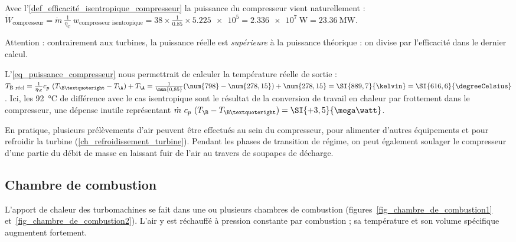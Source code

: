 \begin{anexample}
\begin{answer}
					 Avec l’\cref{def_efficacité_isentropique_compresseur} la puissance du compresseur vient naturellement : $\dot W_\text{compresseur} = \dot m \ \frac{1}{\eta_\text{C}} \ w_\text{compresseur isentropique} = \num{38} \times \frac{1}{\num{0,85}} \times \num{5,225e5} = \SI{2,336e7}{\watt} = \SI{23,36}{\mega\watt}$.
					 	\begin{remark}
					 		Attention : contrairement aux turbines, la puissance réelle est \emph{supérieure} à la puissance théorique : on divise par l’efficacité dans le dernier calcul.
					 	\end{remark}
					 	\begin{remark}
					 		L’\cref{eq_puissance_compresseur} nous permettrait de calculer la température réelle de sortie : $T_\text{B réel} = \frac{1}{\eta_\C} c_p \ (T_{\B’} - T_\A) + T_\A = \frac{1}{\num{0,85}} (\num{798} - \num{278,15}) + \num{278,15} = \SI{889,7}{\kelvin} = \SI{616,6}{\degreeCelsius}$. Ici, les \SI{92}{\degreeCelsius} de différence avec le cas isentropique sont le résultat de la conversion de travail en chaleur par frottement dans le compresseur, une dépense inutile représentant $\dot m \ c_p \ (T_\B - T_{\B’}) = \SI{+3,5}{\mega\watt}$.
					 	\end{remark}
				\end{answer}
		\end{anexample}

		En pratique, plusieurs prélèvements d’air peuvent être effectués au sein du compresseur, pour alimenter d’autres équipements et pour refroidir la turbine (\ref{ch_refroidissement_turbine}). Pendant les phases de transition de régime, on peut également soulager le compresseur d’une partie du débit de masse en laissant fuir de l’air au travers de soupapes de décharge.


	\subsection{Chambre de combustion}

		L’apport de chaleur des turbomachines se fait dans une ou plusieurs chambres de combustion (figures~\ref{fig_chambre_de_combustion1} et~\ref{fig_chambre_de_combustion2}). L’air y est réchauffé à pression constante par combustion ; sa température et son volume spécifique augmentent fortement.

